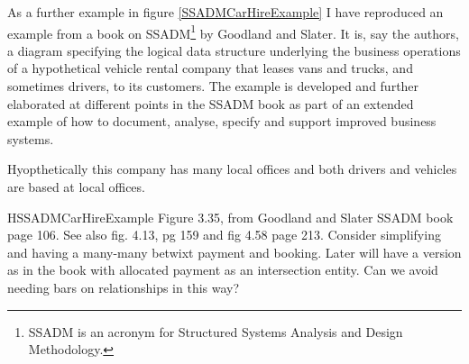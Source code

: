 \mynote As a further example in figure \ref{SSADMCarHireExample}  I have reproduced an example from a book on SSADM\footnote{SSADM is an acronym for Structured Systems Analysis and Design Methodology.} by Goodland and Slater. It is, say the authors, a diagram specifying the logical data structure underlying the business operations of a hypothetical vehicle rental company that leases vans and trucks, and sometimes drivers, to its customers. 
\mynote
The example is developed and further elaborated at different points in the SSADM book as part of an extended example
of how to document, analyse, specify and support improved business systems. 

\mynote Hyopthetically this company has many local offices and both drivers and vehicles are based at local offices. 
\begin{erboxedFigure} {H}{SSADMCarHireExample}{
Figure 3.35, from Goodland and Slater SSADM book page 106. See also fig. 4.13, pg 159 and fig 4.58 page 213.
Consider simplifying and having a many-many betwixt payment and booking. 
Later will have a version as in the book with allocated payment as an intersection entity. 
Can we avoid needing bars on relationships in this way?
}

\begin{center}
\scalebox{0.95}{}
\end{center}
\end{erboxedFigure}

